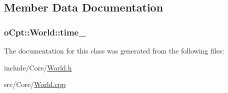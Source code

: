 \subsection{Member Data Documentation}
\subsubsection[{\texorpdfstring{time\+\_\+}{time_}}]{ o\+Cpt\+::\+World\+::time\+\_\+\hspace{0.3cm}{\ttfamily [protected]}}\hypertarget{classo_cpt_1_1_world_a2f93632f34dd13d0a61eec6d8d2879ff}{}\label{classo_cpt_1_1_world_a2f93632f34dd13d0a61eec6d8d2879ff}


The documentation for this class was generated from the following files\+:\begin{DoxyCompactItemize}
\item 
include/\+Core/\hyperlink{_world_8h}{World.\+h}\item 
src/\+Core/\hyperlink{_world_8cpp}{World.\+cpp}\end{DoxyCompactItemize}
